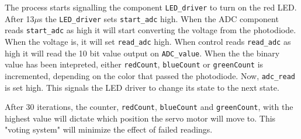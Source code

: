 The process starts signalling the component \texttt{LED\_driver} to turn on the red LED. 
After 13$\mu$s the \texttt{LED\_driver} sets \texttt{start\_adc} high. 
When the ADC component reads \texttt{start\_adc} as high it will start converting the voltage from the photodiode.  
When the voltage is, it will set \texttt{read\_adc} high. 
When control reads \texttt{read\_adc} as high it will read the 10 bit value output on \texttt{ADC\_value}. When the the binary value has been intepreted, either \texttt{redCount}, \texttt{blueCount} or \texttt{greenCount} is incremented, depending on the color that passed the photodiode.
Now, \texttt{adc\_read} is set high. This signals the LED driver to change its state to the next state.

After 30 iterations, the counter, \texttt{redCount}, \texttt{blueCount} and \texttt{greenCount}, with the highest value will dictate which position the servo motor will move to.
This "voting system" will minimize the effect of failed readings.

